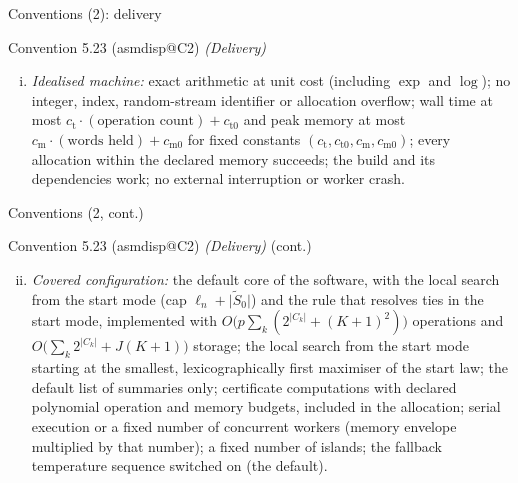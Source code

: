 \documentclass[aspectratio=169]{beamer}
\makeatletter
\newcommand{\asmdisp}[1]{\csname asmdisp@#1\endcsname}
\newcommand{\abs}[1]{\lvert #1\rvert}
\newcommand{\tSz}{\tilde S_0}
\makeatother
\begin{document}
\begin{frame}{Conventions (2): delivery}
\small
\begin{block}{Convention 5.23 (\asmdisp{C2}) \textit{(Delivery)}}
\begin{enumerate}[(i)]
  \item \emph{Idealised machine:} exact arithmetic at unit cost (including $\exp$ and $\log$); no integer, index,
    random-stream identifier or allocation overflow; wall time at most $c_{\mathrm t}\cdot(\text{operation count})+c_{\mathrm
    t0}$ and peak memory at most $c_{\mathrm m}\cdot(\text{words held})+c_{\mathrm m0}$ for fixed constants $(c_{\mathrm
    t},c_{\mathrm t0},c_{\mathrm m},c_{\mathrm m0})$; every allocation within the declared memory succeeds; the build and its
    dependencies work; no external interruption or worker crash.
\end{enumerate}
\end{block}
\end{frame}

\begin{frame}{Conventions (2, cont.)}
\small
\begin{block}{Convention 5.23 (\asmdisp{C2}) \textit{(Delivery)} (cont.)}
\begin{enumerate}[(i)]\setcounter{enumi}{1}
  \item \emph{Covered configuration:} the default core of the software, with the local search from the start mode (cap
    $\ell_n+\abs{\tSz}$) and the rule that resolves ties in the start mode, implemented with
    $O\big(p\sum_k(2^{\abs{C_k}}+(K+1)^2)\big)$ operations and $O\big(\sum_k2^{\abs{C_k}}+J(K+1)\big)$ storage; the local
    search from the start mode starting at the smallest, lexicographically first maximiser of the start law; the default
    list of summaries only; certificate computations with declared polynomial operation and memory budgets, included in
    the allocation; serial execution or a fixed number of concurrent workers (memory envelope multiplied by that number);
    a fixed number of islands; the fallback temperature sequence switched on (the default).
\end{enumerate}
\end{block}
\end{frame}
\end{document}
